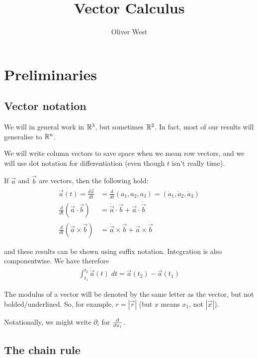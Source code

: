 \documentclass{../template/note}
\author{Oliver West}
\title{Vector Calculus}
\date{}
\begin{document}
    \maketitle

    \tableofcontents


    \section{Preliminaries}

    \subsection{Vector notation}

    We will in general work in \(\mathbb R^3\), but sometimes \(\mathbb R^2\). In fact, most of our results will generalise to \(\mathbb R^n\).

    We will write column vectors to save space when we mean row vectors, and we will use dot notation for differentiation (even though \(t\) isn't really time).

    If \(\vec a\) and \(\vec b\) are vectors, then the following hold:
    \begin{align}
        \dot{\vec a(t)} = \frac{d \vec a}{dt} &= \frac{d}{dt}(a_1, a_2, a_3) = (\dot a_1, \dot a_2, \dot a_3) \\
        \frac{d}{dt}(\vec a \cdot \vec b) &= \dot {\vec a} \cdot \vec b + \vec a \cdot \dot {\vec b} \\
        \frac{d}{dt}(\vec a \times \vec b) &= \dot {\vec a} \times \vec b + \vec a \times \dot{\vec b}
    \end{align}
    
    and these results can be shown using suffix notation. Integration is also componentwise. We have therefore
    \begin{align*}
        \int_{t_1}^{t_2} \dot {\vec a}(t) \; dt = \vec a(t_2) - \vec a(t_1)
    \end{align*}
    
    The modulus of a vector will be denoted by the same letter as the vector, but not bolded/underlined. So, for example, \(r=|\vec r|\) (but \(x\) means \(x_1\), not \(|\vec x|\)).

    Notationally, we might write \(\partial_i\) for \(\pd {}{x_i}\).

    \subsection{The chain rule}
\end{document}
